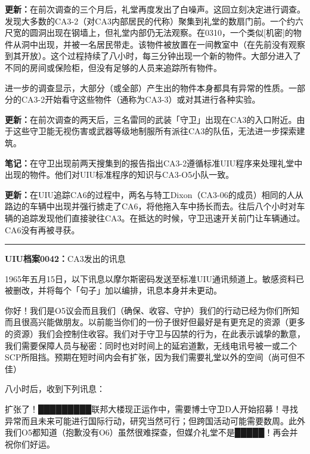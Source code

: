 \documentclass[openany,a4paper]{book} %
\begin{document}
\textbf{更新：}在前次调查的三个月后，礼堂再度发出了白噪声。这回立刻决定进行调查。发现大多数的CA3-2（对CA3内部居民的代称）聚集到礼堂的数扇门前。一个约六尺宽的圆洞出现在钢墙上，但礼堂内部仍无法观察。在0310，一个类似[机密]的物件从洞中出现，并被一名居民带走。该物件被放置在一间教室中（在先前没有观察到其开放）。这个过程持续了八小时，每三分钟出现一个新的物件。大部分进入了不同的房间或保险柜，但没有足够的人员来追踪所有物件。\vspace{12pt}

进一步的调查显示，大部分（或全部）产生出的物件本身都具有异常的性质。一部分的CA3-2开始看守这些物件（通称为CA3-3）或对其进行各种实验。\vspace{12pt}

\textbf{更新：}在前次调查的两天后，三名雷同的武装「守卫」出现在CA3的入口附近。由于这些守卫能无视伤害或武器等级地制服所有派往CA3的队伍，无法进一步探索建筑。\vspace{12pt}

\textbf{笔记：}在守卫出现前两天搜集到的报告指出CA3-2遵循标准UIU程序来处理礼堂中出现的物件。他们对UIU标准程序的知识与CA3-O5小队一致。\vspace{12pt}

\textbf{更新：}在UIU追踪CA6的过程中，两名与特工Dixon（CA3-06的成员）相同的人从路边的车辆中出现并强行掳走了CA6，将他拖入车中扬长而去。往后八个小时对车辆的追踪发现他们直接驶往CA3。在抵达的时候，守卫迅速开关前门让车辆通过。CA6没有再被寻获。\vspace{2pt}

\hrule\vspace{12pt}

\textbf{UIU档案0042：}CA3发出的讯息\vspace{12pt}

1965年五月15日，以下讯息以摩尔斯密码发送至标准UIU通讯频道上。敏感资料已被删改，并将每个「句子」加以编排，讯息本身并未更动。
\begin{colorboxed}
  你好！我们是O5议会而且我们（确保、收容、守护）我们的行动已经为你们所知而且很高兴能做朋友。以前能当你们的一份子很好但最好是有更充足的资源（更多的资源）我们会控制住收容。我们对于守卫与囚禁的行为，在此表示诚挚的歉意，我们需要保障人员与秘密：同时也对时间上的延宕道歉，无线电讯号被一或二个SCP所阻挡。预期在短时间内会有扩张，因为我们需要礼堂以外的空间（尚可但不佳）
\end{colorboxed}\vspace{12pt}

八小时后，收到下列讯息：
\begin{colorboxed}
  扩张了！█████████联邦大楼现正运作中，需要博士守卫D人开始招募！寻找异常而且未来可能进行国际行动，研究当然可行；但跨国活动可能需要数周。此外我们O5都知道（抱歉没有O6）虽然很难探查，但媒介礼堂不是█████！再会并祝你们好运。
\end{colorboxed}\vspace{12pt}
\end{document}
